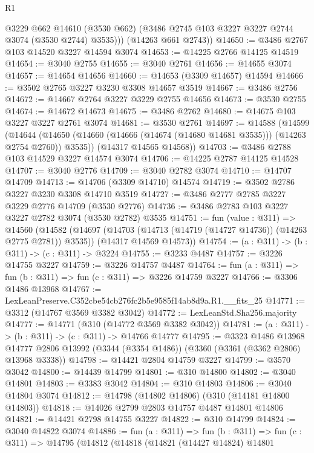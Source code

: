 \begin{lexlean}{R1}
\begin{coremodule}
          @3229
          @662
          @14610
          (@3530 @662)
          (@3486 @2745 @103 @3227 @3227 @2744 @3074 (@3530 @2744) @3535)))
      (@14263 @661 @2743))
@14650 := @3486 @2767 @103 @14520 @3227 @14594 @3074
@14653 := @14225 @2766 @14125 @14519
@14654 := @3040 @2755
@14655 := @3040 @2761
@14656 := @14655 @3074
@14657 := @14654 @14656
@14660 := @14653 (@3309 @14657) @14594
@14666 := @3502 @2765 @3227 @3230 @3308 @14657 @3519
@14667 := @3486 @2756
@14672 := @14667 @2764 @3227 @3229 @2755 @14656
@14673 := @3530 @2755
@14674 := @14672 @14673
@14675 := @3486 @2762
@14680 := @14675 @103 @3227 @3227 @2761 @3074
@14681 := @3530 @2761
@14697 := @14588
    (@14599
      (@14644 (@14650 (@14660 (@14666 (@14674 (@14680 @14681 @3535))) (@14263 @2754 @2760)) @3535))
      (@14317 @14565 @14568))
@14703 := @3486 @2788 @103 @14529 @3227 @14574 @3074
@14706 := @14225 @2787 @14125 @14528
@14707 := @3040 @2776
@14709 := @3040 @2782 @3074
@14710 := @14707 @14709
@14713 := @14706 (@3309 @14710) @14574
@14719 := @3502 @2786 @3227 @3230 @3308 @14710 @3519
@14727 := @3486 @2777 @2785 @3227 @3229 @2776 @14709 (@3530 @2776)
@14736 := @3486 @2783 @103 @3227 @3227 @2782 @3074 (@3530 @2782) @3535
@14751 := fun (value : @311) =>
  @14560
    (@14582
      (@14697 (@14703 (@14713 (@14719 (@14727 @14736)) (@14263 @2775 @2781)) @3535))
      (@14317 @14569 @14573))
@14754 := (a : @311) -> (b : @311) -> (c : @311) -> @3224
@14755 := @3233 @4487
@14757 := @3226 @14755 @3227
@14759 := @3226 @14757 @4487
@14764 := fun (a : @311) => fun (b : @311) => fun (c : @311) => @3226 @14759 @3227
@14766 := @3306 @1486 @13968
@14767 := LexLeanPreserve.C352cbe54cb276fc2b5e9585f14ab8d9a.R1.__fits_25
@14771 := @3312 (@14767 @3569 @3382 @3042)
@14772 := LexLeanStd.Sha256.majority
@14777 := @14771 (@310 (@14772 @3569 @3382 @3042))
@14781 := (a : @311) -> (b : @311) -> (c : @311) -> @14766 @14777
@14795 := @3323
    @1486
    @13968
    @14777
    @2806
    @13992
    (@3344 (@3354 @1486))
    (@3360 (@3361 (@3362 @2806) @13968 @3338))
@14798 := @14421 @2804 @14759 @3227
@14799 := @3570 @3042
@14800 := @14439 @14799
@14801 := @310 @14800
@14802 := @3040 @14801
@14803 := @3383 @3042
@14804 := @310 @14803
@14806 := @3040 @14804 @3074
@14812 := @14798 (@14802 @14806) (@310 (@14181 @14800 @14803))
@14818 := @14026 @2799 @2803 @14757 @4487 @14801 @14806
@14821 := @14421 @2798 @14755 @3227
@14822 := @310 @14799
@14824 := @3040 @14822 @3074
@14886 := fun (a : @311) =>
  fun (b : @311) =>
  fun (c : @311) =>
  @14795
    (@14812
      (@14818
        (@14821
          (@14427 @14824)
          @14801

\end{coremodule}
\end{lexlean}
